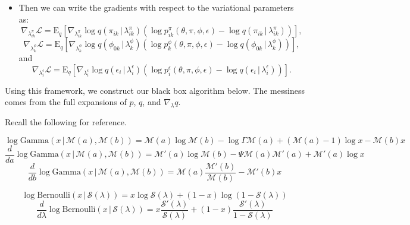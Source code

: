 \documentclass{article}
\newcommand{\E}{\mathrm{E}}
\newcommand{\g}{\, | \,}
\begin{document}
\begin{itemize}
\item Then we can write the gradients with respect to the variational parameters as: \[\nabla_{\lambda^\pi_{ik}} \mathcal{L} = \E_q \left[ \nabla_{\lambda^\pi_{ik}} \log q(\pi_{ik} \g \lambda^\pi_{ik}) \left( \log p^\pi_{ik}(\theta, \pi, \phi, \epsilon) - \log q(\pi_{ik} \g \lambda^\pi_{ik}) \right)\right],\]
\[\nabla_{\lambda^\phi_{k}} \mathcal{L} = \E_q \left[ \nabla_{\lambda^\phi_{k}} \log q(\phi_{0k} \g \lambda^\phi_{k}) \left( \log p^\phi_{k}(\theta, \pi, \phi, \epsilon) - \log q(\phi_{0k} \g \lambda^\phi_{k}) \right)\right],\]
and
\[\nabla_{\lambda^\epsilon_{i}} \mathcal{L} = \E_q \left[ \nabla_{\lambda^\epsilon_{i}} \log q(\epsilon_{i} \g \lambda^\epsilon_{i}) \left( \log p^\epsilon_{i}(\theta, \pi, \phi, \epsilon) - \log q(\epsilon_{i} \g \lambda^\epsilon_{i}) \right)\right].\]
\end{itemize}

Using this framework, we construct our black box algorithm below.  The messiness comes from the full expansions of $p$, $q$, and $\nabla_\lambda q$.

Recall the following for reference.

\[\log\mbox{Gamma}(x \g \mathcal{M}(a), \mathcal{M}(b)) = 
\mathcal{M}(a)\log \mathcal{M}(b) - \log\Gamma \mathcal{M}(a) +(\mathcal{M}(a)-1)\log x -\mathcal{M}(b)x
\]
\[\frac{d}{d a}\log\mbox{Gamma}(x \g \mathcal{M}(a), \mathcal{M}(b)) = 
\mathcal{M}'(a)\log \mathcal{M}(b) - \Psi \mathcal{M}(a)\mathcal{M}'(a) + \mathcal{M}'(a)\log x
\]
\[\frac{d}{d b}\log\mbox{Gamma}(x \g \mathcal{M}(a), \mathcal{M}(b)) = 
\mathcal{M}(a)\frac{\mathcal{M}'(b)}{\mathcal{M}(b)} -\mathcal{M}'(b)x
\]

\[\log\mbox{Bernoulli}(x \g \mathcal{S}(\lambda)) = 
x\log \mathcal{S}(\lambda) +(1-x)\log(1-\mathcal{S}(\lambda))
\]
\[\frac{d}{d \lambda}\log\mbox{Bernoulli}(x \g \mathcal{S}(\lambda)) = 
x\frac{\mathcal{S}'(\lambda)}{\mathcal{S}(\lambda)} + (1-x)\frac{\mathcal{S}'(\lambda)}{1-\mathcal{S}(\lambda)}
\]
\end{document}
